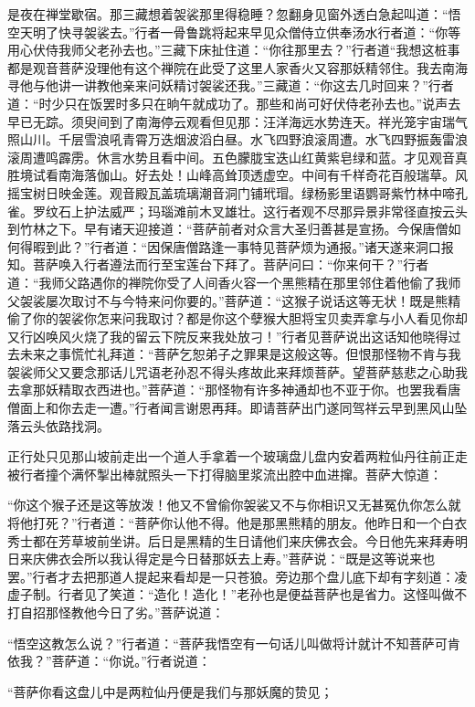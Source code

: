 \documentclass[12pt,UTF8]{ctexbook}
\begin{document}
{是夜在禅堂歇宿。那三藏想着袈裟那里得稳睡？忽翻身见窗外透白急起叫道：“悟空天明了快寻袈裟去。”行者一骨鲁跳将起来早见众僧侍立供奉汤水行者道：“你等用心伏侍我师父老孙去也。”三藏下床扯住道：“你往那里去？”行者道“我想这桩事都是观音菩萨没理他有这个禅院在此受了这里人家香火又容那妖精邻住。我去南海寻他与他讲一讲教他亲来问妖精讨袈裟还我。”三藏道：“你这去几时回来？”行者道：“时少只在饭罢时多只在晌午就成功了。那些和尚可好伏侍老孙去也。”说声去早已无踪。须臾间到了南海停云观看但见那：汪洋海远水势连天。祥光笼宇宙瑞气照山川。千层雪浪吼青霄万迭烟波滔白昼。水飞四野浪滚周遭。水飞四野振轰雷浪滚周遭鸣霹雳。休言水势且看中间。五色朦胧宝迭山红黄紫皂绿和蓝。才见观音真胜境试看南海落伽山。好去处！山峰高耸顶透虚空。中间有千样奇花百般瑞草。风摇宝树日映金莲。观音殿瓦盖琉璃潮音洞门铺玳瑁。绿杨影里语鹦哥紫竹林中啼孔雀。罗纹石上护法威严；玛瑙滩前木叉雄壮。这行者观不尽那异景非常径直按云头到竹林之下。早有诸天迎接道：“菩萨前者对众言大圣归善甚是宣扬。今保唐僧如何得暇到此？”行者道：“因保唐僧路逢一事特见菩萨烦为通报。”诸天遂来洞口报知。菩萨唤入行者遵法而行至宝莲台下拜了。菩萨问曰：“你来何干？”行者道：“我师父路遇你的禅院你受了人间香火容一个黑熊精在那里邻住着他偷了我师父袈裟屡次取讨不与今特来问你要的。”菩萨道：“这猴子说话这等无状！既是熊精偷了你的袈裟你怎来问我取讨？都是你这个孽猴大胆将宝贝卖弄拿与小人看见你却又行凶唤风火烧了我的留云下院反来我处放刁！”行者见菩萨说出这话知他晓得过去未来之事慌忙礼拜道：“菩萨乞恕弟子之罪果是这般这等。但恨那怪物不肯与我袈裟师父又要念那话儿咒语老孙忍不得头疼故此来拜烦菩萨。望菩萨慈悲之心助我去拿那妖精取衣西进也。”菩萨道：“那怪物有许多神通却也不亚于你。也罢我看唐僧面上和你去走一遭。”行者闻言谢恩再拜。即请菩萨出门遂同驾祥云早到黑风山坠落云头依路找洞。

正行处只见那山坡前走出一个道人手拿着一个玻璃盘儿盘内安着两粒仙丹往前正走被行者撞个满怀掣出棒就照头一下打得脑里浆流出腔中血进撺。菩萨大惊道：

“你这个猴子还是这等放泼！他又不曾偷你袈裟又不与你相识又无甚冤仇你怎么就将他打死？”行者道：“菩萨你认他不得。他是那黑熊精的朋友。他昨日和一个白衣秀士都在芳草坡前坐讲。后日是黑精的生日请他们来庆佛衣会。今日他先来拜寿明日来庆佛衣会所以我认得定是今日替那妖去上寿。”菩萨说：“既是这等说来也罢。”行者才去把那道人提起来看却是一只苍狼。旁边那个盘儿底下却有字刻道：凌虚子制。行者见了笑道：“造化！造化！”老孙也是便益菩萨也是省力。这怪叫做不打自招那怪教他今日了劣。”菩萨说道：

“悟空这教怎么说？”行者道：“菩萨我悟空有一句话儿叫做将计就计不知菩萨可肯依我？”菩萨道：“你说。”行者说道：

“菩萨你看这盘儿中是两粒仙丹便是我们与那妖魔的贽见；

}
\end{document}
